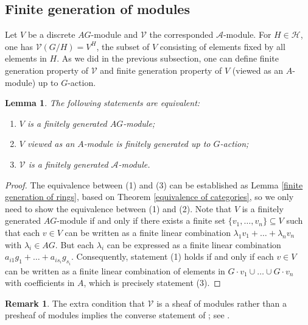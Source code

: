 \documentclass[11pt, reqno]{amsart}
\theoremstyle{plain}
\newtheorem{lemma}[theorem]{Lemma}
\numberwithin{equation}{section}
\theoremstyle{definition}
\newtheorem{remark}[theorem]{Remark}
\begin{document}
\subsection{Finite generation of modules}

Let $V$ be a discrete $AG$-module and $\mathcal{V}$ the corresponded $\mathcal{A}$-module. For $H \in \mathcal{H}$, one has $\mathcal{V}(G/H) = V^H$, the subset of $V$ consisting of elements fixed by all elements in $H$. As we did in the previous subsection, one can define finite generation property of $\mathcal{V}$ and finite generation property of $V$ (viewed as an $A$-module) up to $G$-action.

\begin{lemma} \label{equivalence of finitely generated modules}
The following statements are equivalent:
\begin{enumerate}
\item $V$ is a finitely generated $AG$-module;

\item $V$ viewed as an $A$-module is finitely generated up to $G$-action;

\item $\mathcal{V}$ is a finitely generated $\mathcal{A}$-module.
\end{enumerate}
\end{lemma}

\begin{proof}
The equivalence between (1) and (3) can be established as Lemma \ref{finite generation of rings}, based on Theorem \ref{equivalence of categories}, so we only need to show the equivalence between (1) and (2). Note that $V$ is a finitely generated $AG$-module if and only if there exists a finite set $\{ v_1, \ldots, v_n \}\subseteq V$ such that each $v \in V$ can be written as a finite linear combination $\lambda_1 v_1 + \ldots + \lambda_n v_n$ with $\lambda_i \in AG$. But each $\lambda_i$ can be expressed as a finite linear combination $a_{i1}g_1 + \ldots + a_{is_i} g_{s_i}$. Consequently, statement (1) holds if and only if each $v \in V$ can be written as a finite linear combination of elements in $G \cdot v_1 \cup \ldots \cup G \cdot v_n$ with coefficients in $A$, which is precisely statement (3).
\end{proof}

\begin{remark}
The extra condition that $\mathcal{V}$ is a sheaf of modules rather than a presheaf of modules implies the converse statement of \cite[Proposition 3.14]{NR1}; see \cite[Remark 3.15]{NR1}.
\end{remark}
\end{document}
